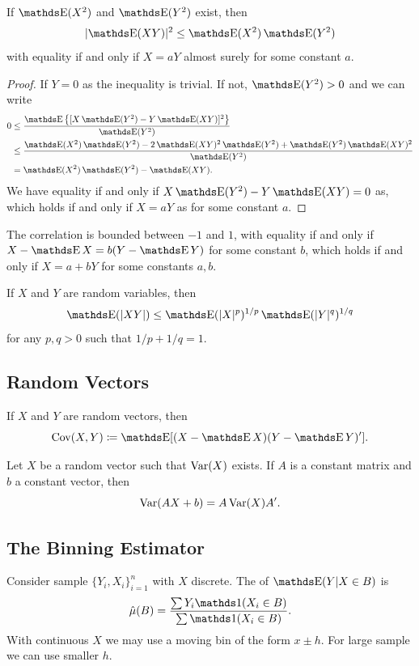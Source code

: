 \documentclass[letterpaper, 10pt]{article}
\begin{document}
\begin{theorem}
  If \(\E(X^2)\) and  \(\E(Y^2)\) exist, then
  \[
    \abs{\E(XY)}^2 \leq \E(X^2) \E(Y^2)
  \]
  with equality if and only if \(X = aY\) almost surely for some constant \(a\).
\end{theorem}
\begin{proof}
  If \(Y = 0\) as the inequality is trivial.
  If not, \(\E(Y^2) > 0\) and we can write
  \begin{align*}
    0
    &\leq \frac{\E\left\{ [X \E(Y^2) - Y \E(XY)]^2 \right\}}{\E(Y^2)} \\
    &\leq \frac{\E(X^2) \E(Y^2) - 2 \E(XY)^2 \E(Y^2) + \E(Y^2) \E(XY)^2}{\E(Y^2)} \\
    &= \E(X^2) \E(Y^2) - \E(XY).
  \end{align*}
  We have equality if and only if \(X \E(Y^2) - Y \E(XY) = 0\) as, which holds if and only if \(X = aY\) as for some constant \(a\).
\end{proof}
\begin{corollary}
  The correlation is bounded between \(-1\) and \(1\), with equality if and only if \(X - \E X = b(Y - \E Y)\) for some constant \(b\), which holds if and only if \(X = a + bY\) for some constants \(a, b\).
\end{corollary}

\begin{theorem}
  If \(X\) and \(Y\) are random variables, then
  \[
    \E(\abs{XY}) \leq \E(\abs{X}^p)^{1/p} \E(\abs{Y}^q)^{1/q}
  \]
  for any \(p, q > 0\) such that \(1/p + 1/q = 1\).
\end{theorem}


\subsection{Random Vectors}
\begin{definition}
  If \(X\) and \(Y\) are random vectors, then
  \[
    \Cov(X, Y)
    \coloneqq \E[(X - \E X) (Y - \E Y)'].
  \]
\end{definition}

\begin{proposition}
  Let \(X\) be a random vector such that \(\operatorname{Var}(X)\) exists.
  If \(A\) is a constant matrix and \(b\) a constant vector, then
  \[
    \operatorname{Var}(AX + b)
    = A \operatorname{Var}(X) A'.
  \]
\end{proposition}


\subsection{The Binning Estimator}
Consider sample \(\{Y_i, X_i\}_{i = 1}^n\) with \(X\) discrete.
The  of \(\E(Y|X \in B)\) is
\[
  \hat{\mu}(B)
  = \frac{\sum Y_i \ind(X_i \in B)}{\sum \ind(X_i \in B)}.
\]
With continuous \(X\) we may use a moving bin of the form \(x \pm h\).
For large sample we can use smaller \(h\).
\end{document}
